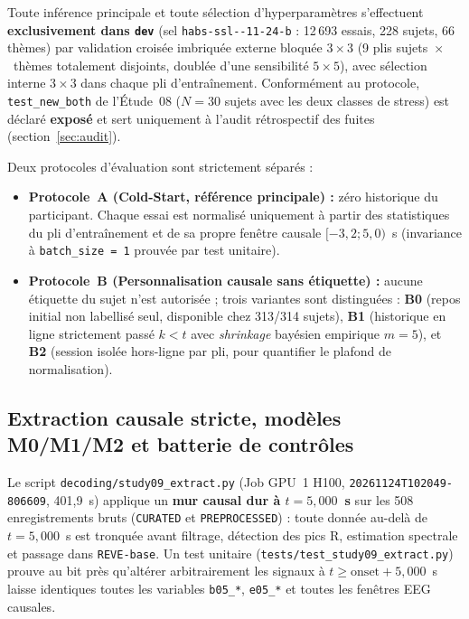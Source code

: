 \documentclass[10pt]{article}
\begin{document}
Toute inférence principale et toute sélection d'hyperparamètres s'effectuent \textbf{exclusivement dans \texttt{dev}} (sel \texttt{habs-ssl--11-24-b} : 12\,693 essais, 228 sujets, 66 thèmes) par validation croisée imbriquée externe bloquée $3 \times 3$ (9 plis sujets~$\times$~thèmes totalement disjoints, doublée d'une sensibilité $5 \times 5$), avec sélection interne $3 \times 3$ dans chaque pli d'entraînement. Conformément au protocole, \texttt{test\_\allowbreak new\_both} de l'Étude~08 ($N = 30$ sujets avec les deux classes de stress) est déclaré \textbf{exposé} et sert uniquement à l'audit rétrospectif des fuites (section~\ref{sec:audit}).

Deux protocoles d'évaluation sont strictement séparés :
\begin{itemize}
\item \textbf{Protocole~A (Cold-Start, référence principale) :} zéro historique du participant. Chaque essai est normalisé uniquement à partir des statistiques du pli d'entraînement et de sa propre fenêtre causale $[-3{,}2 ; 5{,}0)$~s (invariance à \texttt{batch\_size = 1} prouvée par test unitaire).
\item \textbf{Protocole~B (Personnalisation causale sans étiquette) :} aucune étiquette du sujet n'est autorisée ; trois variantes sont distinguées : \textbf{B0} (repos initial non labellisé seul, disponible chez 313/314 sujets), \textbf{B1} (historique en ligne strictement passé $k < t$ avec \emph{shrinkage} bayésien empirique $m = 5$), et \textbf{B2} (session isolée hors-ligne par pli, pour quantifier le plafond de normalisation).
\end{itemize}

\subsection{Extraction causale stricte, modèles M0/M1/M2 et batterie de contrôles}

Le script \texttt{decoding/\allowbreak study09\_extract.py} (Job GPU~1 H100, \texttt{20261124T102049-806609}, 401,9~s) applique un \textbf{mur causal dur à $t = 5{,}000$~s} sur les 508 enregistrements bruts (\texttt{CURATED} et \texttt{PREPROCESSED}) : toute donnée au-delà de $t = 5{,}000$~s est tronquée avant filtrage, détection des pics R, estimation spectrale et passage dans \texttt{REVE-base}. Un test unitaire (\texttt{tests/\allowbreak test\_study09\_extract.py}) prouve au bit près qu'altérer arbitrairement les signaux à $t \ge \text{onset} + 5{,}000$~s laisse identiques toutes les variables \texttt{b05\_*}, \texttt{e05\_*} et toutes les fenêtres EEG causales.
\end{document}
